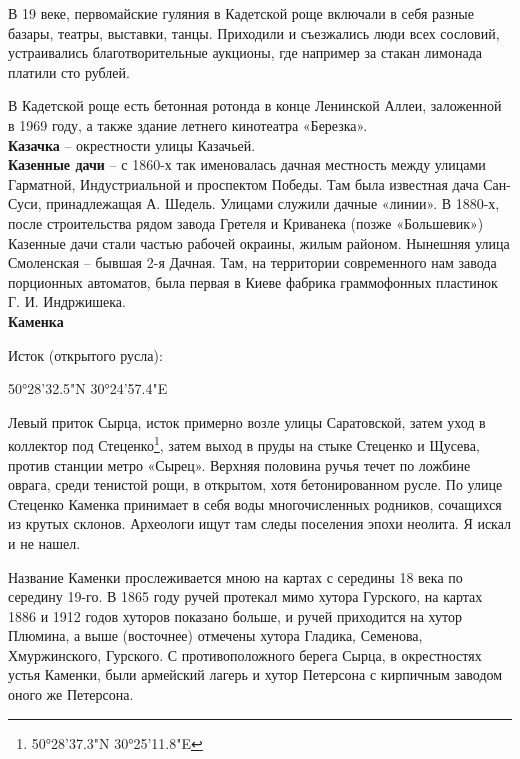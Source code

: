 
В 19 веке, первомайские гуляния в Кадетской роще включали в себя разные базары, театры, выставки, танцы. Приходили и съезжались люди всех сословий, устраивались благотворительные аукционы, где например за стакан лимонада платили сто рублей.

В Кадетской роще есть бетонная ротонда в конце Ленинской Аллеи, заложенной в 1969 году, а также здание летнего кинотеатра «Березка».\\

\textbf{Казачка} – окрестности улицы Казачьей.\\

\textbf{Казенные дачи} – с 1860-х так именовалась дачная местность между улицами Гарматной, Индустриальной и проспектом Победы. Там была известная дача Сан-Суси, принадлежащая А. Шедель. Улицами служили дачные «линии». В 1880-х, после строительства рядом завода Гретеля и Криванека (позже «Большевик») Казенные дачи стали частью рабочей окраины, жилым районом. Нынешняя улица Смоленская – бывшая 2-я Дачная. Там, на территории современного нам завода порционных автоматов, была первая в Киеве фабрика граммофонных пластинок Г. И. Индржишека.\\

\textbf{Каменка}

Исток (открытого русла): 

50°28'32.5"N 30°24'57.4"E

Левый приток Сырца, исток примерно возле улицы Саратовской, затем уход в коллектор под Стеценко\footnote{50°28'37.3"N 30°25'11.8"E}, затем выход в пруды на стыке Стеценко и Щусева, против станции метро «Сырец». Верхняя половина ручья течет по ложбине оврага, среди тенистой рощи, в открытом, хотя бетонированном русле. По улице Стеценко Каменка принимает в себя воды многочисленных родников, сочащихся из крутых склонов. Археологи ищут там следы поселения эпохи неолита. Я искал и не нашел.

Название Каменки прослеживается мною на картах с середины 18 века по середину 19-го. В 1865 году ручей протекал мимо хутора Гурского, на картах 1886 и 1912 годов хуторов показано больше, и ручей приходится на хутор Плюмина, а выше (восточнее) отмечены хутора Гладика, Семенова, Хмуржинского, Гурского. С противоположного берега Сырца, в окрестностях устья Каменки, были армейский лагерь и хутор Петерсона с кирпичным заводом оного же Петерсона.

